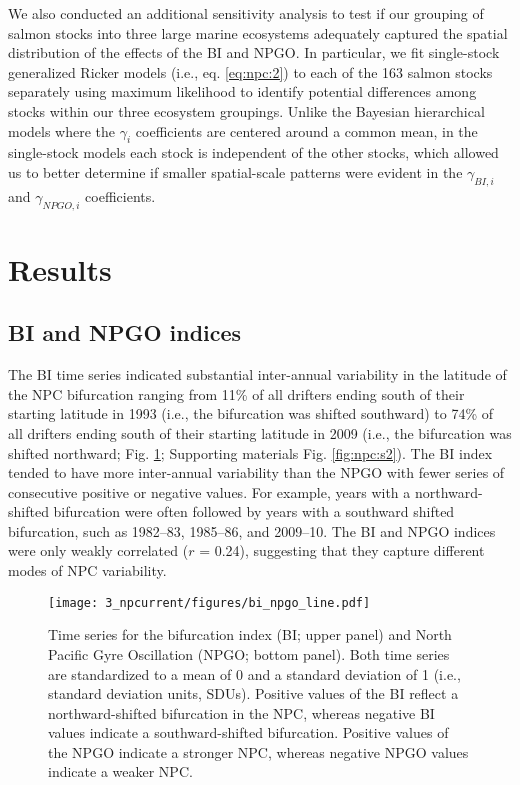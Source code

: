 We also conducted an additional sensitivity analysis to test if our grouping of
salmon stocks into three large marine ecosystems adequately captured the spatial
distribution of the effects of the BI and NPGO. In particular, we fit
single-stock generalized Ricker models (i.e., eq. \ref{eq:npc:2}) to each of the
163 salmon stocks separately using maximum likelihood to identify potential
differences among stocks within our three ecosystem groupings. Unlike the
Bayesian hierarchical models where the \(\gamma_i\) coefficients are centered
around a common mean, in the single-stock models each stock is independent of
the other stocks, which allowed us to better determine if smaller spatial-scale
patterns were evident in the \(\gamma_{BI,i}\) and \(\gamma_{NPGO,i}\)
coefficients.



\section{Results}

\subsection{BI and NPGO indices}

The BI time series indicated substantial inter-annual variability in the
latitude of the NPC bifurcation ranging from 11\% of all drifters ending south
of their starting latitude in 1993 (i.e., the bifurcation was shifted southward)
to 74\% of all drifters ending south of their starting latitude in 2009 (i.e.,
the bifurcation was shifted northward; Fig. \ref{fig:npc:2}; Supporting
materials Fig. \ref{fig:npc:s2}). The BI index tended to have more inter-annual
variability than the NPGO with fewer series of consecutive positive or negative
values. For example, years with a northward-shifted bifurcation were often
followed by years with a southward shifted bifurcation, such as 1982--83,
1985--86, and 2009--10. The BI and NPGO indices were only weakly correlated
(\(r\) = 0.24), suggesting that they capture different modes of NPC variability.

\begin{figure}[htbp]
  \centering \texttt{[image: 3\_npcurrent/figures/bi\_npgo\_line.pdf]}
  \caption[Time series for the bifurcation index and North Pacific Gyre
           Oscillation]{Time series for the bifurcation index (BI; upper panel)
           and North Pacific Gyre Oscillation (NPGO; bottom panel). Both time
           series are standardized to a mean of 0 and a standard deviation of 1
           (i.e., standard deviation units, SDUs). Positive values of the BI
           reflect a northward-shifted bifurcation in the NPC, whereas negative
           BI values indicate a southward-shifted bifurcation. Positive values
           of the NPGO indicate a stronger NPC, whereas negative NPGO values
           indicate a weaker NPC.}
  \label{fig:npc:2}
\end{figure}


